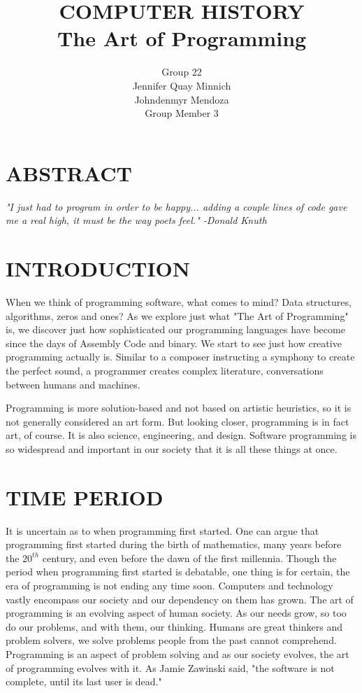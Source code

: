 \documentclass[letterpaper, 10 pt, conference]{IEEEconf}
\title{\LARGE \bf
COMPUTER HISTORY\\
\large The Art of Programming
}
\author{Group 22\\
\small Jennifer Quay Minnich\\
\small Johndenmyr Mendoza\\
\small Group Member 3\\
}
\begin{document}
\maketitle
\thispagestyle{empty}
\pagestyle{empty}


\section*{ABSTRACT}
\textit{
"I just had to program in order to be happy... 
adding a couple lines of code gave me a real high, 
it must be the way poets feel." 
-Donald Knuth
}

\section{INTRODUCTION}

When we think of programming software, what comes to mind?  Data structures, 
algorithms, zeros and ones? As we explore just what "The Art of Programming" is,
we discover just how sophisticated our programming languages have become 
since the days of Assembly Code and binary. We start to see just how creative
programming actually is. Similar to a composer instructing a symphony to create
the perfect sound, a programmer creates complex literature, conversations between 
humans and machines.

Programming is more solution-based and not based on artistic heuristics, so it is 
not generally considered an art form. But looking closer, programming is in fact art,
of course. It is also science, engineering, and design. Software programming is so 
widespread and important in our society that it is all these things at once.

\section{TIME PERIOD}

It is uncertain as to when programming first started. One can argue that programming first started during the birth of mathematics, many years before the $20^{th}$ century, and even before the dawn of the first millennia. Though the period when programming first started is debatable, one thing is for certain, the era of programming is not ending any time soon. Computers and technology vastly encompass our society and our dependency on them has grown. The art of programming is an evolving aspect of human society. As our needs grow, so too do our problems, and with them, our thinking. Humans are great thinkers and problem solvers, we solve problems people from the past cannot comprehend. Programming is an aspect of problem solving and as our society evolves, the art of programming evolves with it. As Jamie Zawinski said, "the software is not complete, until its last user is dead."
\end{document}
